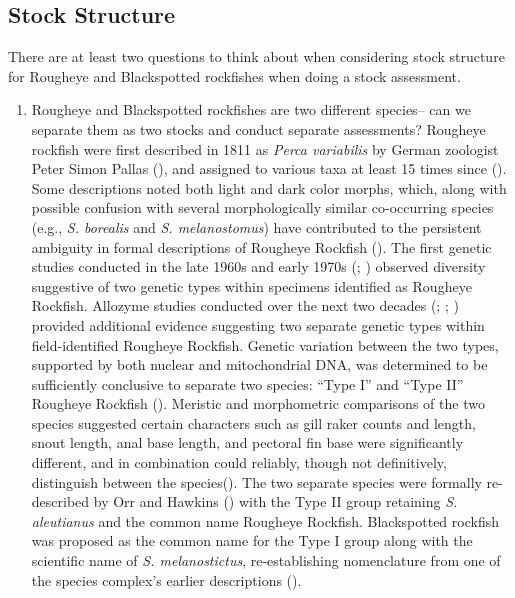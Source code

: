 \documentclass[
]{scrartcl}
\providecommand{\tightlist}{%
  \setlength{\itemsep}{0pt}\setlength{\parskip}{0pt}}\usepackage{longtable,booktabs,array}
\begin{document}
\subsection{Stock Structure}\label{stock-structure}

There are at least two questions to think about when considering stock
structure for Rougheye and Blackspotted rockfishes when doing a stock
assessment.

\begin{enumerate}
\def\labelenumi{\arabic{enumi}.}
\tightlist
\item
  Rougheye and Blackspotted rockfishes are two different species-- can
  we separate them as two stocks and conduct separate assessments?
  Rougheye rockfish were first described in 1811 as \emph{Perca
  variabilis} by German zoologist Peter Simon Pallas
  (), and
  assigned to various taxa at least 15 times since
  (). Some descriptions noted both light and dark color morphs,
  which, along with possible confusion with several morphologically
  similar co-occurring species (e.g., \emph{S. borealis} and \emph{S.
  melanostomus}) have contributed to the persistent ambiguity in formal
  descriptions of Rougheye Rockfish (). The first genetic studies conducted in the late
  1960s and early 1970s
  (;
  )
  observed diversity suggestive of two genetic types within specimens
  identified as Rougheye Rockfish. Allozyme studies conducted over the
  next two decades (;
  ; )
  provided additional evidence suggesting two separate genetic types
  within field-identified Rougheye Rockfish. Genetic variation between
  the two types, supported by both nuclear and mitochondrial DNA, was
  determined to be sufficiently conclusive to separate two species:
  ``Type I'' and ``Type II'' Rougheye Rockfish
  ().
  Meristic and morphometric comparisons of the two species suggested
  certain characters such as gill raker counts and length, snout length,
  anal base length, and pectoral fin base were significantly different,
  and in combination could reliably, though not definitively,
  distinguish between the
  species(). The two separate species were formally re-described by Orr and
  Hawkins () with the Type II group
  retaining \emph{S. aleutianus} and the common name Rougheye Rockfish.
  Blackspotted rockfish was proposed as the common name for the Type I
  group along with the scientific name of \emph{S. melanostictus},
  re-establishing nomenclature from one of the species complex's earlier
  descriptions ().
\end{enumerate}
\end{document}

